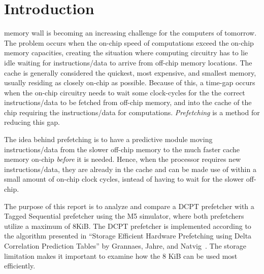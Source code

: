 \section{Introduction}

 memory wall is becoming an increasing challenge for the
computers of tomorrow. The problem occurs when the on-chip speed of computations
exceed the on-chip memory capacities, creating the situation where computing
circuitry has to lie idle waiting for instructions/data to arrive from off-chip
memory locations. The cache is generally considered the quickest, most
expensive, and smallest memory, usually residing as closely on-chip as possible.
Because of this, a time-gap occurs when the on-chip circuitry needs to wait some
clock-cycles for the the correct instructions/data to be fetched from off-chip
memory, and into the cache of the chip requiring the instructions/data for
computations. \emph{Prefetching} is a method for reducing this gap.

The idea behind prefetching is to have a predictive module moving
instructions/data from the slower off-chip memory to the much faster cache
memory on-chip \emph{before} it is needed. Hence, when the processor requires
new instructions/data, they are already in the cache and can be made use of
within a small amount of on-chip clock cycles, isntead of having to wait for the
slower off-chip.

The purpose of this report is to analyze and compare a DCPT prefetcher with a
Tagged Sequential prefetcher using the M5 simulator, where both prefetchers
utilize a maximum of 8KiB. The DCPT prefetcher is implemented according to the
algorithm presented in ``Storage Efficient Hardware Prefetching using Delta
Correlation Prediction Tables'' by Grannaes, Jahre, and Natvig~\cite{dcpt}. The
storage limitation makes it important to examine how the 8 KiB can be used most
efficiently.


